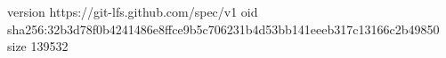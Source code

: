 version https://git-lfs.github.com/spec/v1
oid sha256:32b3d78f0b4241486e8ffce9b5c706231b4d53bb141eeeb317c13166c2b49850
size 139532
